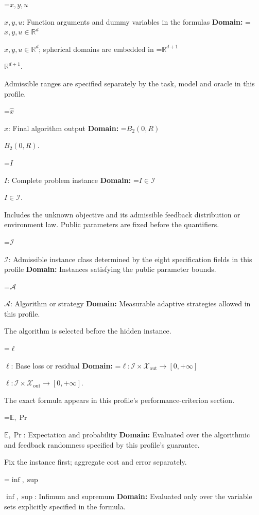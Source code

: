 \documentclass[10pt,a4paper]{article}
\newcommand{\AtlasMath}[1]{\par\begingroup\centering\setbox0=\hbox{$\displaystyle #1$}\ifdim\wd0>1.4\linewidth\typeout{ATLAS WIDE FORMULA: \the\wd0}\fi\ifdim\wd0>\linewidth\resizebox{\linewidth}{!}{\box0}\else\box0\fi\par\endgroup}
\newcommand{\AtlasInlineMath}[1]{\begingroup\setbox0=\hbox{$#1$}\ifdim\wd0>.4\linewidth\endgroup\AtlasMath{#1}\else\endgroup$#1$\fi}
\begin{document}
\AtlasInlineMath{x,y,u}: Function arguments and dummy variables in the formulas \textbf{Domain:} \AtlasInlineMath{x,y,u\in\mathbb{R}^d}; spherical domains are embedded in \AtlasInlineMath{\mathbb{R}^{d+1}}.



Admissible ranges are specified separately by the task, model and oracle in this profile.



\AtlasInlineMath{\widehat{x}}: Final algorithm output \textbf{Domain:} \AtlasInlineMath{B_2(0,R)}.



\AtlasInlineMath{I}: Complete problem instance \textbf{Domain:} \AtlasInlineMath{I\in\mathcal{I}}.



Includes the unknown objective and its admissible feedback distribution or environment law. Public parameters are fixed before the quantifiers.



\AtlasInlineMath{\mathcal{I}}: Admissible instance class determined by the eight specification fields in this profile \textbf{Domain:} Instances satisfying the public parameter bounds.



\AtlasInlineMath{\mathcal{A}}: Algorithm or strategy \textbf{Domain:} Measurable adaptive strategies allowed in this profile.



The algorithm is selected before the hidden instance.



\AtlasInlineMath{\ell}: Base loss or residual \textbf{Domain:} \AtlasInlineMath{\ell:\mathcal{I}\times\mathcal{X}_{\mathrm{out}}\to[0,+\infty]}.



The exact formula appears in this profile's performance-criterion section.



\AtlasInlineMath{\mathbb{E},\Pr}: Expectation and probability \textbf{Domain:} Evaluated over the algorithmic and feedback randomness specified by this profile's guarantee.



Fix the instance first; aggregate cost and error separately.



\AtlasInlineMath{\inf,\sup}: Infimum and supremum \textbf{Domain:} Evaluated only over the variable sets explicitly specified in the formula.
\end{document}
